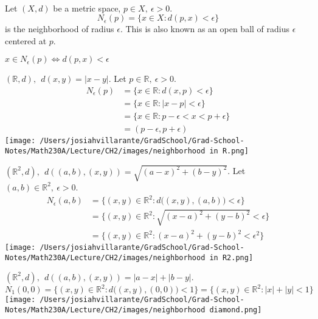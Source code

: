 \begin{definition}[Neighborhood] \leavevmode \\
    Let $(X,d)$ be a metric space, $p \in X, ~\epsilon > 0$.
    $$N_\epsilon (p) = \{x\in X : d(p,x) < \epsilon\}$$
    is the neighborhood of radius $\epsilon$. This is also known as an open ball of radius $\epsilon$ centered at $p$.
\end{definition}

\begin{note}
    $x\in N_\epsilon (p) \iff d(p,x) < \epsilon$
\end{note}

\begin{example}
    $(\mathbb{R}, d),~~ d(x,y) = |x-y|$.
    Let $p \in \mathbb{R}, ~\epsilon > 0.$
    \begin{align*}
        N_\epsilon (p) &= \{x \in \mathbb{R} : d(x,p) < \epsilon\} \\
        &=\{x \in \mathbb{R} : |x - p| < \epsilon\} \\
        &= \{x \in \mathbb{R} : p -\epsilon < x < p + \epsilon\} \\
        &=(p-\epsilon, p + \epsilon)
    \end{align*}
    \texttt{[image: /Users/josiahvillarante/GradSchool/Grad-School-Notes/Math230A/Lecture/CH2/images/neighborhood in R.png]}
\end{example}

\begin{example}
    $(\mathbb{R}^2, d), ~~d((a,b),(x,y)) = \sqrt{(a-x)^2 + (b-y)^2}$.
    Let $(a,b) \in \mathbb{R}^2, ~\epsilon > 0$.
    \begin{align*}
        N_\epsilon(a,b) &= \{(x,y) \in \mathbb{R}^2 : d\big((x,y),(a,b)\big) < \epsilon\} \\ &= \{(x,y) \in \mathbb{R}^2 : \sqrt{(x-a)^2+(y-b)^2} < \epsilon \} \\ &= \{(x,y) \in \mathbb{R}^2 : (x-a)^2 + (y-b)^2 < \epsilon^2 \}
    \end{align*}
    \texttt{[image: /Users/josiahvillarante/GradSchool/Grad-School-Notes/Math230A/Lecture/CH2/images/neighborhood in R2.png]}
\end{example}

\begin{example}
     $(\mathbb{R}^2, d), ~~d((a,b),(x,y))= |a-x|+|b-y|.$ $$N_1(0,0) = \{(x,y) \in \mathbb{R}^2 : d\big((x,y),(0,0)\big) < 1\} = \{(x,y) \in \mathbb{R}^2 : |x| + |y| < 1\}$$
     \texttt{[image: /Users/josiahvillarante/GradSchool/Grad-School-Notes/Math230A/Lecture/CH2/images/neighborhood diamond.png]}
\end{example}


